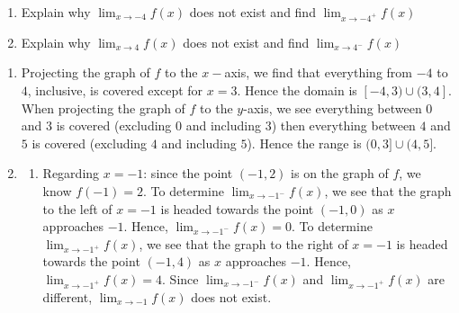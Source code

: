 \documentclass{ximera}
\begin{document}
\begin{example}
\begin{enumerate}
\begin{enumerate}
 
\item Behavior at and near $x = 3$:

\begin{itemize}
 \item $f(3)$
 
 \item  $\lim_{x \rightarrow 3^{-}} f(x)$
 
  \item  $\lim_{x \rightarrow 3^{+}} f(x)$
 
   \item  $\lim_{x \rightarrow 3} f(x)$

 \end{itemize}
 \end{enumerate}
 

 


\item  Explain why  $\lim_{x \rightarrow -4} f(x)$ does not exist and find  $\lim_{x \rightarrow -4^{+}} f(x)$


\item  Explain why  $\lim_{x \rightarrow 4} f(x)$ does not exist and find  $\lim_{x \rightarrow 4^{-}} f(x)$

\end{enumerate}

\begin{explanation}

\begin{enumerate}

\item  Projecting the graph of $f$ to the $x-$axis, we find that everything from $-4$ to $4$, inclusive, is covered except for $x = 3$.  Hence the domain is $[-4,3) \cup (3,4]$.  When projecting the graph of $f$ to the $y$-axis, we see everything between $0$ and $3$ is covered (excluding $0$ and including $3$) then everything between $4$  and $5$ is covered (excluding $4$ and including $5$).  Hence the range is $(0,3] \cup (4,5]$.


\item  \begin{enumerate}  \item  Regarding $x = -1$:  since the point $(-1,2)$ is on the graph of $f$, we know $f(-1) =2$.  To determine  $\lim_{x \rightarrow -1^{-}} f(x)$, we see that the graph to the left of $x = -1$ is headed towards the point $(-1,0)$ as $x$ approaches $-1$.  Hence,  $\lim_{x \rightarrow -1^{-}} f(x)= 0$.  To determine  $\lim_{x \rightarrow -1^{+}} f(x)$, we see that the graph to the right of $x = -1$  is headed towards the point $(-1,4)$ as $x$ approaches $-1$.  Hence,  $\lim_{x \rightarrow -1^{+}} f(x)= 4$.    Since $\lim_{x \rightarrow -1^{-}} f(x)$ and $\lim_{x \rightarrow -1^{+}} f(x)$ are different,  $\lim_{x \rightarrow -1} f(x)$ does not exist.



\end{enumerate}
\end{enumerate}
\end{explanation}
\end{example}
\end{document}
